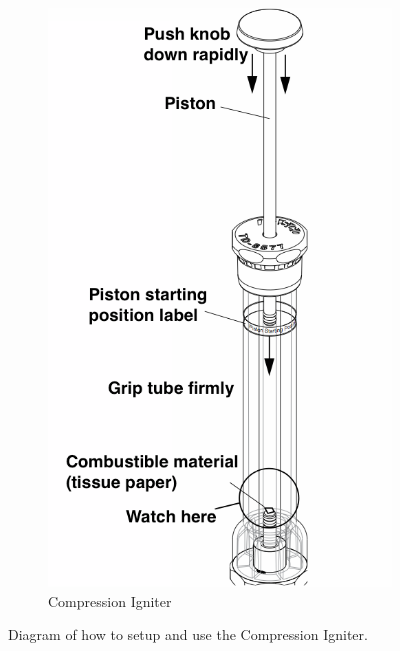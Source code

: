 \begin{figure}
\begin{subfigure}{0.48\textwidth}
	\includegraphics[width=0.9\linewidth]{./Exp10/pic/adiabignite}
	\caption{Compression Igniter}
\end{subfigure}
\caption{Diagram of how to setup and use the Compression Igniter.}
\label{adiabapp}
\end{figure}

